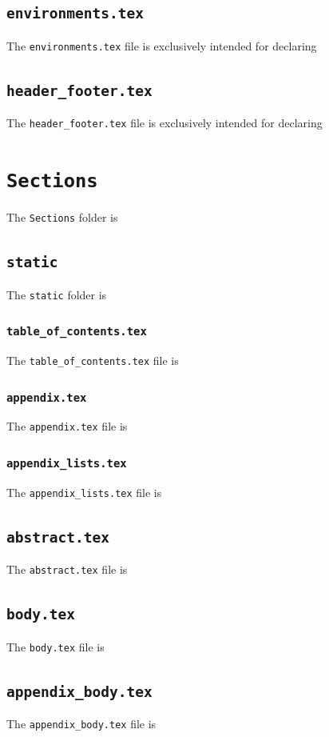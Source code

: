 \subsection{\texttt{environments.tex}}
\label{sec:environments.tex}

The \texttt{environments.tex} file is exclusively intended for declaring 

\subsection{\texttt{header\_footer.tex}}
\label{sec:header_footer.tex}

The \texttt{header\_footer.tex} file is exclusively intended for declaring 

\section{\texttt{Sections}}
\label{sec:sections}

The \texttt{Sections} folder is 

\subsection{\texttt{static}}
\label{sec:static}

The \texttt{static} folder is 

\subsubsection{\texttt{table\_of\_contents.tex}}
\label{sec:table_of_contents.tex}

The \texttt{table\_of\_contents.tex} file is 

\subsubsection{\texttt{appendix.tex}}
\label{sec:appendix.tex}

The \texttt{appendix.tex} file is 

\subsubsection{\texttt{appendix\_lists.tex}}
\label{sec:appendix_lists.tex}

The \texttt{appendix\_lists.tex} file is 

\subsection{\texttt{abstract.tex}}
\label{sec:abstract.tex}

The \texttt{abstract.tex} file is 

\subsection{\texttt{body.tex}}
\label{sec:body.tex}

The \texttt{body.tex} file is 

\subsection{\texttt{appendix\_body.tex}}
\label{appendix_body.tex}

The \texttt{appendix\_body.tex} file is 

